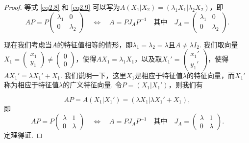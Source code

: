 \begin{proof}
    等式 \eqref{eq2.8} 和 \eqref{eq2.9} 可以写为$A(X_1|X_2)=(\lambda_1X_1|\lambda_2X_2)$，即
    \[
      AP = P \begin{pmatrix}
        \lambda_1 & 0 \\
        0 & \lambda_2
      \end{pmatrix}\quad \Leftrightarrow\quad A = PJ_AP^{-1}\quad \text{其中}\quad
      J_A = \begin{pmatrix}
        \lambda_1 & 0 \\
        0 & \lambda_2
      \end{pmatrix} .
    \]
    \begin{enuma}
      \setcounter{enumi}{1}
      \item 现在我们考虑当$A$的特征值相等的情形，即$\lambda_1=\lambda_2=\lambda$且$A\ne\lambda I_2 $. 我们取向量$X_1=\begin{pmatrix}
            x_1 \\ y_1
          \end{pmatrix}\ne\begin{pmatrix}
            0 \\ 0
          \end{pmatrix}$，使得$AX_1=\lambda_1X_1$，以及取$X_1'=\begin{pmatrix}
            x_1' \\ y_1'
          \end{pmatrix}$，使得$AX_1'=\lambda X_1'+X_1$. 我们说明一下，这里$X_1$是相应于特征值$\lambda$的特征向量，而$X_1'$称为相应于特征值$\lambda$的{\kaishu 广义特征向量}. 令$P=(X_1|X_1')$，则我们有
    \end{enuma}
          \[
            AP = A(X_1|X_1') = (\lambda X_1|\lambda X_1' + X_1),
          \]
    即
    \[
      AP = P\begin{pmatrix}
        \lambda & 1 \\
        0 & \lambda
      \end{pmatrix}\quad \Leftrightarrow\quad
      A = PJ_AP^{-1}\quad \text{其中}\quad
      J_A = \begin{pmatrix}
        \lambda & 1 \\
        0 & \lambda
      \end{pmatrix}.
    \]
    定理得证.
\end{proof}

